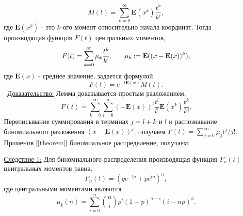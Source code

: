 \documentclass[13pt]{article}
\begin{document}
\begin{equation}
    M(t) = \sum_{k=0}^{\infty}\mathbf{E}(x^{k})\frac{t^{k}}{k!},
\end{equation}
где $\mathbf {E}(x^{k})$ - это $k$-ого момент относительно начала координат. Тогда производящая функция $F(t)$ центральных моментов,
\[
F(t)= \sum_{k=0}^{\infty}\mu_{k}\frac{t^{k}}{k!}, \hspace{6 mm} \mu_{k}:=\mathbf{E}((x-\mathbf{E}(x))^k),
\]
где $\mathbf{E}(x)$ - среднее значение. задается формулой
\[
F(t) = e^{-t\mathbf{E}(x)}M(t).
\]\
\underline{Доказательство:} Лемма доказывается простым разложением,
\[
F(t) = \sum_{k = 0}^{\infty}\sum_{l=0}^{\infty}(-\mathbf{E}(x))^{l}\frac{t^{l}}{l!}\mathbf{E}(x^{k})\frac{t^{k}}{k!}.
\]
Переписывание суммирования в терминах $j=l +k$ и $l$ и распознавание биномиального разложения $(x-\mathbf{E}(x))^{j}$, получаем $F(t)=\sum_{j=0}^{\infty}\mu_{j}t^{j}/j!$.
Применив [\ref{theorem}] биномиальное распределение, получаем:\par
\underline{Следствие 1:} Для биномиального распределения производящая функция $F_{n}(t)$ центральных моментов равна,
\[
F_{n}(t)=(qe^{-tp} + pe^{tq})^n,
\]
где центральными моментами являются
\[
\mu_{k}(n)=\sum_{i=0}^{n}\binom{n}{i}p^{i}(1-p)^{n-i}(i-np)^{k}.
\]
\end{document}
